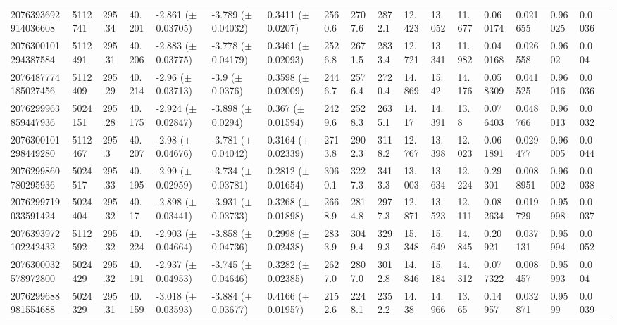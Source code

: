 \begin{sidewaystable}[htbp]
{\begin{tabular}{llllllllllllllllll}
            2076393692914036608 & 5112741 & 295.34 & 40.201 & -2.861 ($\pm$ 0.03705) & -3.789 ($\pm$ 0.04032) & 0.3411 ($\pm$ 0.0207) & 2560.6 & 2707.6 & 2872.1 & 12.423 & 13.052 & 11.677 & 0.060174 & 0.021655 & 0.96025 & 0.0036 & \\
            2076300101294387584 & 5112491 & 295.31 & 40.206 & -2.883 ($\pm$ 0.03775) & -3.778 ($\pm$ 0.04179) & 0.3461 ($\pm$ 0.02093) & 2526.8 & 2671.5 & 2833.4 & 12.721 & 13.341 & 11.982 & 0.040168 & 0.026558 & 0.9602 & 0.004 & \\
            2076487774185027456 & 5112409 & 295.29 & 40.214 & -2.96 ($\pm$ 0.03713) & -3.9 ($\pm$ 0.0376) & 0.3598 ($\pm$ 0.02009) & 2446.7 & 2576.4 & 2720.4 & 14.869 & 15.42 & 14.176 & 0.058309 & 0.041525 & 0.96016 & 0.0036 & \\
            2076299963859447936 & 5024151 & 295.28 & 40.175 & -2.924 ($\pm$ 0.02847) & -3.898 ($\pm$ 0.0294) & 0.367 ($\pm$ 0.01594) & 2429.6 & 2528.3 & 2635.1 & 14.17 & 14.391 & 13.8 & 0.076403 & 0.048766 & 0.96013 & 0.0032 & \\
            2076300101298449280 & 5112467 & 295.3 & 40.207 & -2.98 ($\pm$ 0.04676) & -3.781 ($\pm$ 0.04042) & 0.3164 ($\pm$ 0.02339) & 2713.8 & 2902.3 & 3118.2 & 12.767 & 13.398 & 12.023 & 0.061891 & 0.029477 & 0.96005 & 0.0044 & \\
            2076299860780295936 & 5024517 & 295.33 & 40.195 & -2.99 ($\pm$ 0.02959) & -3.734 ($\pm$ 0.03781) & 0.2812 ($\pm$ 0.01654) & 3060.1 & 3227.3 & 3413.3 & 13.003 & 13.634 & 12.224 & 0.29301 & 0.0088951 & 0.96002 & 0.0038 & \\
            2076299719033591424 & 5024404 & 295.32 & 40.17 & -2.898 ($\pm$ 0.03441) & -3.931 ($\pm$ 0.03733) & 0.3268 ($\pm$ 0.01898) & 2668.9 & 2814.8 & 2977.3 & 12.871 & 13.523 & 12.111 & 0.082634 & 0.019729 & 0.95998 & 0.0037 & \\
            2076393972102242432 & 5112592 & 295.32 & 40.224 & -2.903 ($\pm$ 0.04664) & -3.858 ($\pm$ 0.04736) & 0.2998 ($\pm$ 0.02438) & 2833.9 & 3049.4 & 3299.3 & 15.348 & 15.649 & 14.845 & 0.20921 & 0.037131 & 0.95994 & 0.0052 & \\
            2076300032578972800 & 5024429 & 295.32 & 40.191 & -2.937 ($\pm$ 0.04953) & -3.745 ($\pm$ 0.04646) & 0.3282 ($\pm$ 0.02385) & 2627.0 & 2807.0 & 3012.8 & 14.846 & 15.184 & 14.312 & 0.077322 & 0.008457 & 0.95993 & 0.004 & \\
            2076299688981554688 & 5024329 & 295.31 & 40.159 & -3.018 ($\pm$ 0.03593) & -3.884 ($\pm$ 0.03677) & 0.4166 ($\pm$ 0.01957) & 2152.6 & 2248.1 & 2352.2 & 14.38 & 14.966 & 13.65 & 0.14957 & 0.032871 & 0.9599 & 0.0039 & \\

\end{tabular}}
\end{sidewaystable}
